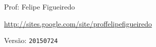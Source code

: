 \documentclass[a4paper]{article}
\begin{document}
\parbox[c]{.825\textwidth}{\raggedright%
{Prof: Felipe Figueiredo\par}
{\url{http://sites.google.com/site/proffelipefigueiredo}\par}
}

Versão: \verb|20150724|



\end{document}
